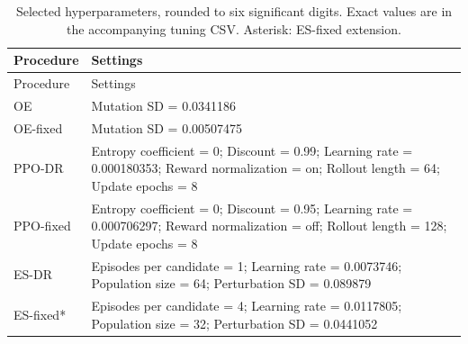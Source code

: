 {\small
\begin{longtable}{lP{12cm}}
\caption{Selected hyperparameters, rounded to six significant digits. Exact values are in the accompanying tuning CSV. Asterisk: ES-fixed extension.}\label{tab:settings}\\
\toprule
Procedure & Settings\\\midrule
\endfirsthead
\toprule
Procedure & Settings\\\midrule
\endhead
\bottomrule\endfoot
OE & Mutation SD = 0.0341186\\
OE-fixed & Mutation SD = 0.00507475\\
PPO-DR & Entropy coefficient = 0; Discount = 0.99; Learning rate = 0.000180353; Reward normalization = on; Rollout length = 64; Update epochs = 8\\
PPO-fixed & Entropy coefficient = 0; Discount = 0.95; Learning rate = 0.000706297; Reward normalization = off; Rollout length = 128; Update epochs = 8\\
ES-DR & Episodes per candidate = 1; Learning rate = 0.0073746; Population size = 64; Perturbation SD = 0.089879\\
ES-fixed* & Episodes per candidate = 4; Learning rate = 0.0117805; Population size = 32; Perturbation SD = 0.0441052\\
\end{longtable}
}
